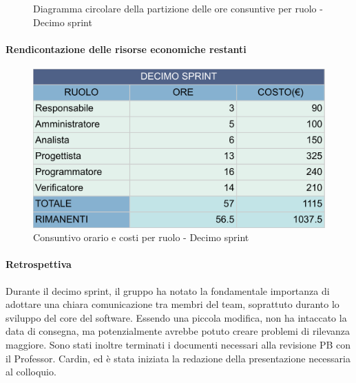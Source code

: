 \documentclass[10pt]{article}
\begin{document}
{{{{{{{{{{{            \begin{figure}[H]
                \centering
                \caption{Diagramma circolare della partizione delle ore consuntive per ruolo - Decimo sprint}
                \label{fig:Diagramma circolare della partizione delle ore consuntive per ruolo - Decimo sprint}
            \end{figure}
    
            \paragraph{Rendicontazione delle risorse economiche restanti}\mbox{}\vspace{0.4em}
            \begin{figure}[H]
                \centering
                \includegraphics[width=0.6\linewidth]{oreCostiDecimoSprint.png}
                \caption{Consuntivo orario e costi per ruolo - Decimo sprint}
                \label{fig:Consuntivo orario e costi per ruolo - Decimo sprint}
            \end{figure}
            
            \paragraph{Retrospettiva}\mbox{}\vspace{0.4em}

            Durante il decimo sprint, il gruppo ha notato la fondamentale importanza di adottare una chiara comunicazione tra membri del team, soprattuto duranto lo sviluppo del core del software. Essendo una piccola modifica, non ha intaccato la data di consegna, ma potenzialmente avrebbe potuto creare problemi di rilevanza maggiore. Sono stati inoltre terminati i documenti necessari alla revisione PB con il Professor. Cardin, ed è stata iniziata la redazione della presentazione necessaria al colloquio.
    
}}}}}}}}}}}
\end{document}
